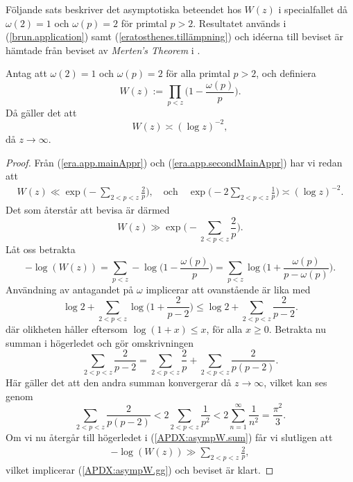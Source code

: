 Följande sats beskriver det asymptotiska beteendet hos $W(z)$ i specialfallet då $\omega(2)=1$ och $\omega(p)=2$ för primtal $p>2$. 
Resultatet används i (\ref{brun.application}) samt (\ref{eratosthenes.tillämpning}) och idéerna till beviset är hämtade från beviset av \textit{Merten's Theorem} i \cite[kap 5.2]{cojocarumurty}.

\begin{theorem} \label{APDX:asympW}
Antag att $\omega(2)=1$ och $\omega(p)=2$ för alla primtal $p>2$, och definiera 
\begin{equation*}
    W(z):=\prod_{p<z}\biggl( 1-\frac{\omega(p)}{p} \biggr).   
\end{equation*}
Då gäller det att
\begin{equation} \label{APDX:asympW.main}
    W(z) \asymp (\log z)^{-2},
\end{equation}
då $z\to\infty$.
\end{theorem}


\begin{proof}
Från (\ref{era.app.mainAppr}) och (\ref{era.app.secondMainAppr}) har vi redan att
\begin{align*}
    W(z) \ll \exp \biggl( - \sum_{2 <p < z} \frac{2}{p}  \biggr),
    \quad\text{och}\quad
    \exp \biggl( - 2 \sum_{2 <p < z} \frac{1}{p}  \biggr) \asymp (\log z)^{-2}.
\end{align*}
Det som återstår att bevisa är därmed
\begin{equation} \label{APDX:asympW.gg}
    W(z) \gg \exp \biggl( - \sum_{2 <p < z} \frac{2}{p}  \biggr).
\end{equation}
Låt oss betrakta
\begin{equation*}
    -\log(W(z)) 
    = \sum_{p < z} -\log\biggl( 1-\frac{\omega(p)}{p} \biggr) 
    = \sum_{p < z} \log\biggl( 1+\frac{\omega(p)}{p-\omega(p)} \biggr).
\end{equation*}
Användning av antagandet på $\omega$ implicerar att ovanstående är lika med 
\begin{equation} \label{APDX:asympW.sum}
    \log 2 + \sum_{2<p<z} \log\biggl( 1+\frac{2}{p-2} \biggr)
    \leq \log 2 + \sum_{2<p<z} \frac{2}{p-2}.
\end{equation}
där olikheten håller eftersom $\log(1+x)\leq x$, för alla $x\geq0$. 
Betrakta nu summan i högerledet och gör omskrivningen
\begin{equation*}
    \sum_{2 <p < z} \frac{2}{p-2} = \sum_{2 <p < z} \frac{2}{p} + \sum_{2 <p < z} \frac{2}{p(p-2)}.
\end{equation*}
Här gäller det att den andra summan konvergerar då $z\to\infty$, vilket kan ses genom
\begin{equation*}
    \sum_{2 <p < z} \frac{2}{p(p-2)} < 2\sum_{2 <p < z} \frac{1}{p^2} < 2\sum_{n = 1}^\infty \frac{1}{n^2} = \frac{\pi^2}{3}.
\end{equation*}
Om vi nu återgår till högerledet i (\ref{APDX:asympW.sum}) får vi slutligen att
\begin{align*}
    -\log(W(z)) \gg \sum_{2 <p < z} \frac{2}{p},
\end{align*}
vilket implicerar (\ref{APDX:asympW.gg}) och beviset är klart.
\end{proof}